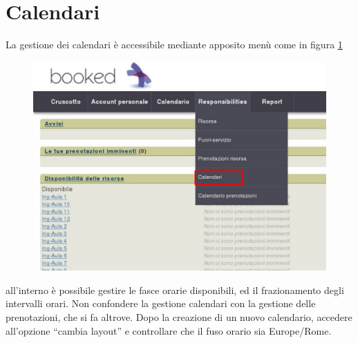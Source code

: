 \section{Calendari}
La gestione dei calendari è accessibile mediante apposito menù come in figura
\ref{fig:amministratore_menu_generale_selezione_calendari.pdf}
\begin{figure}[H]
\centering{}\includegraphics[scale=0.5]{Immagini/amministratore_menu_generale_selezione_calendari.pdf}
\normalsize
\caption{}
\label{fig:amministratore_menu_generale_selezione_calendari.pdf}
\end{figure}

all'interno è possibile gestire le fasce orarie disponibili, ed il frazionamento degli intervalli orari.
Non confondere la gestione calendari con la gestione delle prenotazioni, che si fa altrove.
Dopo la creazione di un nuovo calendario, accedere all'opzione ``cambia layout'' e controllare che il fuso
orario sia Europe/Rome.